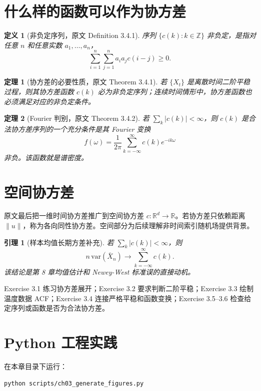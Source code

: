 \documentclass[11pt,a4paper,openany]{ctexbook}
\newtheorem{definition}{定义}[section]
\newtheorem{theorem}{定理}[section]
\newtheorem{lemma}{引理}[section]
\begin{document}
\section{什么样的函数可以作为协方差}

\begin{definition}[非负定序列，原文 Definition 3.4.1]
序列 \(\{c(k):k\in\mathbb Z\}\) 非负定，是指对任意 \(n\) 和任意实数 \(a_1,\ldots,a_n\)，
\[
  \sum_{i=1}^n\sum_{j=1}^n a_i a_j c(i-j)\ge0.
\]
\end{definition}

\begin{theorem}[协方差的必要性质，原文 Theorem 3.4.1]
若 \(\{X_t\}\) 是离散时间二阶平稳过程，则其协方差函数 \(c(k)\) 必为非负定序列；连续时间情形中，协方差函数也必须满足对应的非负定条件。
\end{theorem}

\begin{theorem}[Fourier 判别，原文 Theorem 3.4.2]
若 \(\sum_k |c(k)|<\infty\)，则 \(c(k)\) 是合法协方差序列的一个充分条件是其 Fourier 变换
\[
  f(\omega)=\frac1{2\pi}\sum_{k=-\infty}^{\infty}c(k)e^{-ik\omega}
\]
非负。该函数就是谱密度。
\end{theorem}

\section{空间协方差}

原文最后把一维时间协方差推广到空间协方差 \(c:\mathbb R^d\to\mathbb R\)。若协方差只依赖距离 \(\|u\|\)，称为各向同性协方差。空间部分为后续理解非时间索引随机场提供背景。

\begin{lemma}[样本均值长期方差补充]
若 \(\sum_k|c(k)|<\infty\)，则
\[
  n\,\mathrm{var}(\bar X_n)
  \to \sum_{k=-\infty}^{\infty}c(k).
\]
该结论是第 8 章均值估计和 Newey-West 标准误的直接动机。
\end{lemma}

Exercise 3.1 练习协方差展开；Exercise 3.2 要求判断二阶平稳；Exercise 3.3 绘制温度数据 ACF；Exercise 3.4 连接严格平稳和函数变换；Exercise 3.5--3.6 检查给定序列或函数是否为合法协方差。

\section{Python 工程实践}

在本章目录下运行：
\begin{lstlisting}[language=bash]
python scripts/ch03_generate_figures.py
\end{lstlisting}
\end{document}

